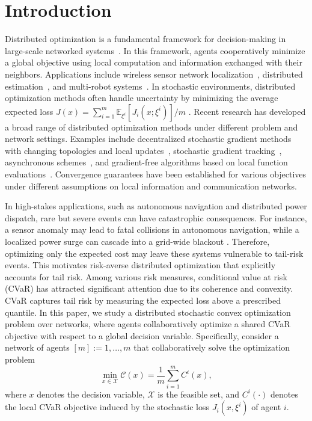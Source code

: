 \documentclass[twocolumn]{autart}    %
\newcommand{\1}{\mathbf{1}}
\begin{document}
 

 
%
\section{Introduction}
\label{sec:0_intro}
%
 
 

 
Distributed optimization is a fundamental framework for decision-making in large-scale networked systems~\cite{nedic2018distributed}. In this framework, agents cooperatively minimize a global objective using local computation and information exchanged with their neighbors. Applications include wireless sensor network localization~\cite{simonetto2014distributed}, distributed estimation~\cite{rabbat2004distributed}, and multi-robot systems~\cite{shorinwa2024distributeda,shorinwa2024distributedb}.
In stochastic environments,  distributed optimization methods often
handle uncertainty by minimizing the average expected loss $J(x) = \sum_{i=1}^m\mathbb{E}_{\xi^i}[ J_i(x;\xi^i)]/m$ \cite{sundhar2010distributed,xie2025differentially}. 
Recent research has developed a broad range of distributed optimization methods under different problem and network settings. 
Examples include decentralized stochastic gradient methods with changing topologies and local 
updates~\cite{koloskova2020unified}, stochastic gradient tracking~\cite{pu2021distributed}, 
asynchronous schemes~\cite{even2024asynchronous}, 
and gradient-free algorithms based on local function 
evaluations~\cite{pang2022gradient,yi2022zeroth,tang2023zeroth,yuan2024distributed}. 
Convergence guarantees have been established for various objectives under different assumptions on local information and communication networks.


In high-stakes applications, such as autonomous navigation and distributed power dispatch, 
rare but severe events can have catastrophic consequences. 
For instance, a sensor anomaly may lead to fatal collisions in autonomous navigation, 
while a localized power surge can cascade into a grid-wide blackout \cite{basaran2026comprehensive}. 
Therefore, optimizing only the expected cost may leave these systems vulnerable to tail-risk events.
This motivates risk-averse distributed optimization that explicitly accounts for tail risk.
Among various risk measures, conditional value at risk (CVaR) has attracted significant attention due to its coherence and convexity.
CVaR captures tail risk by measuring the expected loss above a prescribed quantile. 
In this paper, we study a distributed stochastic convex optimization problem over networks, where agents collaboratively optimize a shared CVaR objective with respect to a global decision variable.
Specifically, consider a network of agents $ [m] := {1,\ldots,m} $ that collaboratively solve the optimization problem
\begin{equation}\label{eq problem}
\min_{x\in\mathcal{X}} \mathcal{C}(x)= 
\frac{1}{m}\sum_{i=1}^{m} C^i(x),
\end{equation}
where $x$ denotes the decision variable, $\mathcal{X}$ is the feasible set, and $C^i(\cdot)$ denotes the local CVaR objective induced by the
stochastic loss $J_i(x,\xi^i)$ of agent $i$.
 
\end{document}
